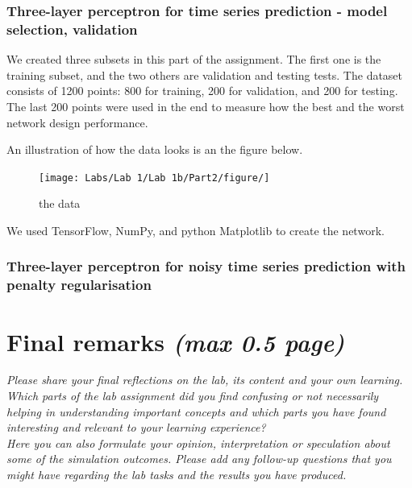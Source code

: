 \documentclass[a4paper]{article}
\begin{document}
\subsubsection{Three-layer perceptron for time series prediction - model selection, validation}

We created three subsets in this part of the assignment. The first one is the training subset, and the two others are validation and testing tests. The dataset consists of 1200 points: 800 for training, 200 for validation, and 200 for testing. The last 200 points were used in the end to measure how the best and the worst network design performance.

An illustration of how the data looks is an the figure below. 
\begin{figure}[htbp]
    \centering
    \texttt{[image: Labs/Lab 1/Lab 1b/Part2/figure/]}
    \caption{the data}
    \label{fig:gauss-function}
\end{figure}
We used TensorFlow, NumPy, and python Matplotlib to create the network. 

\subsubsection{Three-layer perceptron for noisy time series prediction with penalty regularisation}

\section{Final remarks \normalsize{\textit{(max 0.5 page)}}}
\textit{Please share your final reflections on the lab, its content and your own learning. Which parts of the lab assignment did you find confusing or not necessarily helping in understanding important concepts and which parts you have found interesting and relevant to your learning experience? \\
Here you can also formulate your opinion, interpretation or speculation about some of the simulation outcomes. Please add any follow-up questions that you might have regarding the lab tasks and the results you have produced.}
\end{document}
